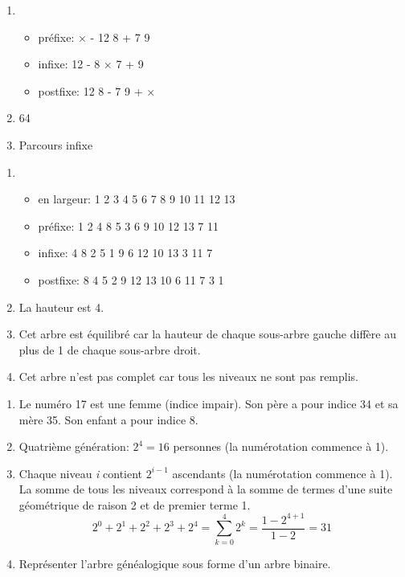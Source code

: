 \documentclass[a4paper,11pt]{article}
\begin{document}
\begin{Form}
\begin{exo}
\begin{enumerate}
\item \begin{itemize}
\item préfixe: × - 12 8 + 7 9
\item infixe: 12 - 8 × 7 + 9
\item postfixe: 12 8 - 7 9 + ×
\end{itemize}
\item 64
\item Parcours infixe
\end{enumerate}
\end{exo}
\begin{exo}
\begin{enumerate}
\item 
\begin{itemize}
\item en largeur: 1 2 3 4 5 6 7 8 9 10 11 12 13
\item préfixe: 1 2 4 8 5 3 6 9 10 12 13 7 11
\item infixe: 4 8 2 5 1 9 6 12 10 13 3 11 7
\item postfixe: 8 4 5 2 9 12 13 10 6 11 7 3 1
\end{itemize}
\item La hauteur est 4.
\item Cet arbre est équilibré car la hauteur de chaque sous-arbre gauche diffère au plus de 1 de chaque sous-arbre droit.
\item Cet arbre n'est pas complet car tous les niveaux ne sont pas remplis.
\end{enumerate}
\end{exo}
\begin{exo}
\begin{enumerate}
\item Le numéro 17 est une femme (indice impair). Son père a pour indice 34 et sa mère 35. Son enfant a pour indice 8.
\item Quatrième génération: $2^4 = 16$ personnes (la numérotation commence à 1).
\item Chaque niveau \emph{i} contient $2^{i-1}$ ascendants (la numérotation commence à 1). La somme de tous les niveaux correspond à la somme de termes d'une suite géométrique de raison 2 et de premier terme 1. $$2^0+2^1+2^2+2^3+2^4=\sum_{k=0}^{4}{2^k}=\dfrac{1-2^{4+1}}{1-2}=31$$
\item Représenter l'arbre généalogique sous forme d'un arbre binaire.

\end{enumerate}
\end{exo}
\end{Form}
\end{document}
